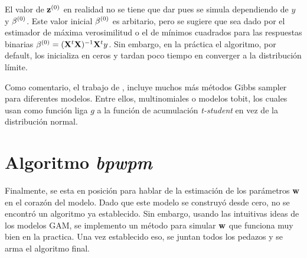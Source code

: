 \documentclass[../Main/Main.tex]{subfiles}
\begin{document}
El valor de $\mathbf{z}^{(0)}$ en realidad no se tiene que dar pues se simula dependiendo de $y$ y $\beta^{(0)}$. Este valor inicial $\beta^{(0)}$ es arbitario, pero se sugiere que sea dado por el estimador de máxima verosimilitud o el de mínimos cuadrados para las respuestas binarias $\beta^{(0)} = (\mathbf{X}^t\mathbf{X})^{-1}\mathbf{X}^ty$. Sin embargo, en la práctica el algoritmo, por default, los inicializa en ceros y tardan poco tiempo en converger a la distribución límite.

Como comentario, el trabajo de \citet{albert1993bayesian}, incluye muchos más métodos Gibbs sampler para diferentes modelos. Entre ellos, multinomiales o modelos tobit, los cuales usan como función liga $g$ a la función de acumulación \textit{t-student} en vez de la distribución normal.   

\section{Algoritmo \textit{bpwpm}}
Finalmente, se esta en posición para hablar de la estimación de los parámetros $\mathbf{w}$ en el corazón del modelo. Dado que este modelo se construyó desde cero, no se encontró un algoritmo ya establecido. Sin embargo, usando las intuitivas ideas de los modelos GAM, se implemento un método para simular $\mathbf{w}$ que funciona muy bien en la practica. Una vez establecido eso, se juntan todos los pedazos y se arma el algoritmo final. 
\end{document}
